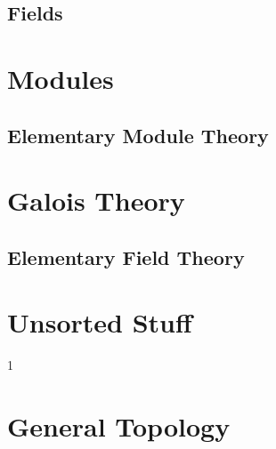 \documentclass{book}                                                           %
\def\compiletopology{0}
\begin{document}
                \chapter{Fields}
                    \renewcommand{\PATH}{\PARPATH/Fields}
                    
            \part{Modules}
                \renewcommand{\PARPATH}{\TOPPATH/Modules}
                \chapter{Elementary  Module Theory}
                    \renewcommand{\PATH}{\PARPATH/Elementary_Properties}
                    \label{chapt:Elementary_Module_Theory}%
                    
            \part{Galois Theory}
                \renewcommand{\PARPATH}{\TOPPATH/Galois_Theory}
                \chapter{Elementary Field Theory}
                    \renewcommand{\PATH}{\PARPATH/Elementary_Field_Theory}
                    
                     
            \part{Unsorted Stuff}
                
                
                
                
        \clearpage
        \setcounter{endpage}{\thepage}
    \else
        \addtocounter{part}{10}
        \addtocounter{chapter}{10}
    \fi

    \if\compiletopology1
            \renewcommand{\TOPPATH}{books/Topology}
            \label{book:Topology}%
            \renewcommand{\PATH}{\TOPPATH/Topology}
            \setcounter{page}{\value{endpage}}
            \part{General Topology}
                \renewcommand{\PARPATH}{\TOPPATH/General_Topology}
\end{document}
